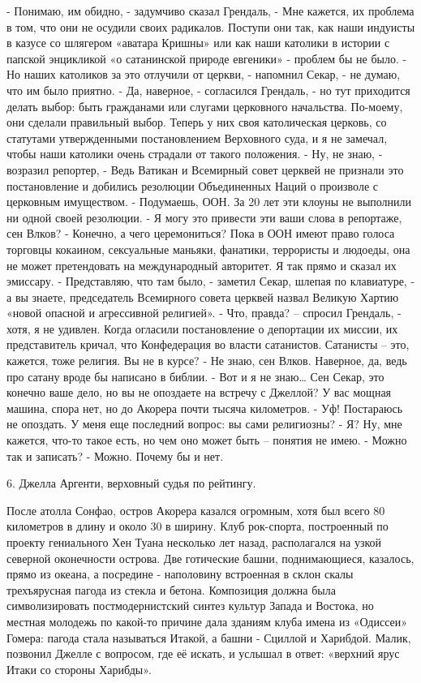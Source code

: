 \documentclass{book}
\begin{document}
- Понимаю, им обидно, - задумчиво сказал Грендаль, - Мне кажется, их проблема в том, что они не осудили своих радикалов. Поступи они так, как наши индуисты в казусе со шлягером «аватара Кришны» или как наши католики в истории с папской энцикликой «о сатанинской природе евгеники» - проблем бы не было.
- Но наших католиков за это отлучили от церкви, - напомнил Секар, - не думаю, что им было приятно.
- Да, наверное, - согласился Грендаль, - но тут приходится делать выбор: быть гражданами или слугами церковного начальства. По-моему, они сделали правильный выбор. Теперь у них своя католическая церковь, со статутами утвержденными постановлением Верховного суда, и я не замечал, чтобы наши католики очень страдали от такого положения.
- Ну, не знаю, - возразил репортер, - Ведь Ватикан и Всемирный совет церквей не признали это постановление и добились резолюции Объединенных Наций о произволе с церковным имуществом.
- Подумаешь, ООН. За 20 лет эти клоуны не выполнили ни одной своей резолюции.
- Я могу это привести эти ваши слова в репортаже, сен Влков?
- Конечно, а чего церемониться? Пока в ООН имеют право голоса торговцы кокаином, сексуальные маньяки, фанатики, террористы и людоеды, она не может претендовать на международный авторитет. Я так прямо и сказал их эмиссару.
- Представляю, что там было, - заметил Секар, шлепая по клавиатуре, - а вы знаете, председатель Всемирного совета церквей назвал Великую Хартию «новой опасной и агрессивной религией».
- Что, правда? -- спросил Грендаль, - хотя, я не удивлен. Когда огласили постановление о депортации их миссии, их представитель кричал, что Конфедерация во власти сатанистов. Сатанисты -- это, кажется, тоже религия. Вы не в курсе?
- Не знаю, сен Влков. Наверное, да, ведь про сатану вроде бы написано в библии.
- Вот и я не знаю\ldots{} Сен Секар, это конечно ваше дело, но вы не опоздаете на встречу с Джеллой? У вас мощная машина, спора нет, но до Акорера почти тысяча километров.
- Уф! Постараюсь не опоздать. У меня еще последний вопрос: вы сами религиозны?
- Я? Ну, мне кажется, что-то такое есть, но чем оно может быть -- понятия не имею.
- Можно так и записать?
- Можно. Почему бы и нет.

6. Джелла Аргенти, верховный судья по рейтингу.

После атолла Сонфао, остров Акорера казался огромным, хотя был всего 80 километров в длину и около 30 в ширину. Клуб рок-спорта, построенный по проекту гениального Хен Туана несколько лет назад, располагался на узкой северной оконечности острова. Две готические башни, поднимающиеся, казалось, прямо из океана, а посредине - наполовину встроенная в склон скалы трехъярусная пагода из стекла и бетона. Композиция должна была символизировать постмодернистский синтез культур Запада и Востока, но местная молодежь по какой-то причине дала зданиям клуба имена из «Одиссеи» Гомера: пагода стала называться Итакой, а башни - Сциллой и Харибдой. Малик, позвонил Джелле с вопросом, где её искать, и услышал в ответ: «верхний ярус Итаки со стороны Харибды».
\end{document}

